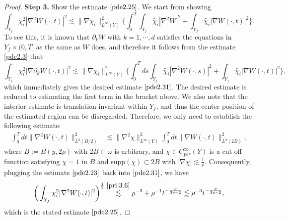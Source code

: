 \documentclass[13pt,CJK]{article}
\theoremstyle{plain}                       %
\theoremstyle{remark}
\numberwithin{equation}{section}
\begin{document}
\begin{proof}
\textbf{Step 3.} Show the estimate $\eqref{pde2.25}$.
We start from showing
\begin{equation}\label{pde2.31}
\int_{Y_f}\chi_i^2|\nabla^2 W(\cdot,t)|^2\lesssim
\|\nabla\chi_i\|^2_{L^{\infty}(Y)}\bigg\{
\int_{0}^{T}\int_{Y_f}\tilde{\chi_i}|\nabla^2 W|^2+\int_{Y_f}\tilde{\chi_i}|\nabla W(\cdot,t)|^2
\bigg\}.
\end{equation}
To see this, it is known that
$\partial_k W$ with $k=1,\cdots,d$ satisfies the equations in
$Y_f\times (0,T]$ as the same as $W$ does, and therefore it follows
from the estimate \eqref{pde2.3} that
\begin{equation*}
\int_{Y_f}\chi_i^2|\nabla \partial_k W(\cdot,t)|^2\lesssim
\|\nabla\chi_i\|^2_{L^{\infty}(Y)}\bigg\{
\int_{0}^{T}ds\int_{Y_f}\tilde{\chi_i}|\nabla^2 W(\cdot,s)|^2
+\int_{Y_f}\tilde{\chi_i}|\nabla W(\cdot,t)|^2
\bigg\},
\end{equation*}
which immediately gives the desired estimate $\eqref{pde2.31}$.
The desired estimate is reduced to estimating the first term in the bracket above. We also note that the interior estimate is translation-invariant within $Y_f$, and thus the center position of the estimated region can be disregarded. Therefore, we only need to establish the following estimate:
\begin{equation}\label{pde2.23}
\begin{aligned}
\int_{0}^Tdt\|\nabla^2 W(\cdot,t)\|^2_{L^2(B/2)}
&\lesssim\|\nabla^2\chi\|^2_{L^{\infty}(Y)}
\int_{0}^{T}dt\|\nabla W(\cdot,t)\|^2_{L^2(2B)},
\end{aligned}
\end{equation}
where $B:=B(y,2\rho)$ with $2B\subset \omega$ is arbitrary, and
$\chi\in C^{\infty}_{per}(Y)$ is a cut-off function
satisfying $\chi = 1$ in $B$ and supp$(\chi)\subset 2B$
with $|\nabla\chi|\lesssim \frac{1}{\rho}$. Consequently,
plugging the estimate $\eqref{pde2.23}$ back into $\eqref{pde2.31}$,
we have
\begin{equation*}
\bigg(\int_{Y_f}\chi_i^2|\nabla^2 W(\cdot,t)|^2
\bigg)^{\frac{1}{2}}
\overset{\eqref{pri:3.6}}{\lesssim} \rho^{-3} + \rho^{-1}t^{-\frac{p}{3p-2}}
\lesssim \rho^{-3}t^{-\frac{p}{3p-2}},
\end{equation*}
which is the stated estimate $\eqref{pde2.25}$.


\end{proof}
\end{document}
